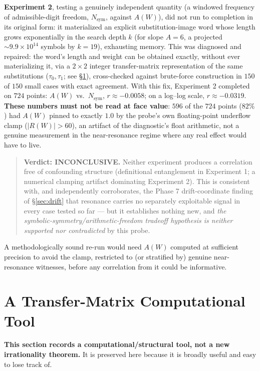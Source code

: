 \documentclass[11pt]{article}
\begin{document}
\textbf{Experiment 2}, testing a genuinely independent quantity (a windowed frequency of admissible-digit freedom, $N_{\text{sym}}$, against $A(W)$), did not run to completion in its original form: it materialized an explicit substitution-image word whose length grows exponentially in the search depth $k$ (for slope $A=6$, a projected $\sim9.9\times10^{14}$ symbols by $k=19$), exhausting memory. This was diagnosed and repaired: the word's length and weight can be obtained exactly, without ever materializing it, via a $2\times2$ integer transfer-matrix representation of the same substitutions ($\tau_0,\tau_1$; see \S\ref{sec:transfermatrix}), cross-checked against brute-force construction in $150$ of $150$ small cases with exact agreement. With this fix, Experiment 2 completed on $724$ points: $A(W)$ vs.\ $N_{\text{sym}}$, $r\approx-0.0058$; on a log--log scale, $r\approx-0.0319$. \textbf{These numbers must not be read at face value}: $596$ of the $724$ points ($82\%$) had $A(W)$ pinned to exactly $1.0$ by the probe's own floating-point underflow clamp ($|R(W)|>60$), an artifact of the diagnostic's float arithmetic, not a genuine measurement in the near-resonance regime where any real effect would have to live.

\begin{quote}
\textbf{Verdict: INCONCLUSIVE.} Neither experiment produces a correlation free of confounding structure (definitional entanglement in Experiment 1; a numerical clamping artifact dominating Experiment 2). This is consistent with, and independently corroborates, the Phase 7 drift-coordinate finding of \S\ref{sec:drift} that resonance carries no separately exploitable signal in every case tested so far --- but it establishes nothing new, and \emph{the symbolic-symmetry/arithmetic-freedom tradeoff hypothesis is neither supported nor contradicted} by this probe.
\end{quote}

A methodologically sound re-run would need $A(W)$ computed at sufficient precision to avoid the clamp, restricted to (or stratified by) genuine near-resonance witnesses, before any correlation from it could be informative.

\section{A Transfer-Matrix Computational Tool}
\label{sec:transfermatrix}

\textbf{This section records a computational/structural tool, not a new irrationality theorem.} It is preserved here because it is broadly useful and easy to lose track of.
\end{document}
